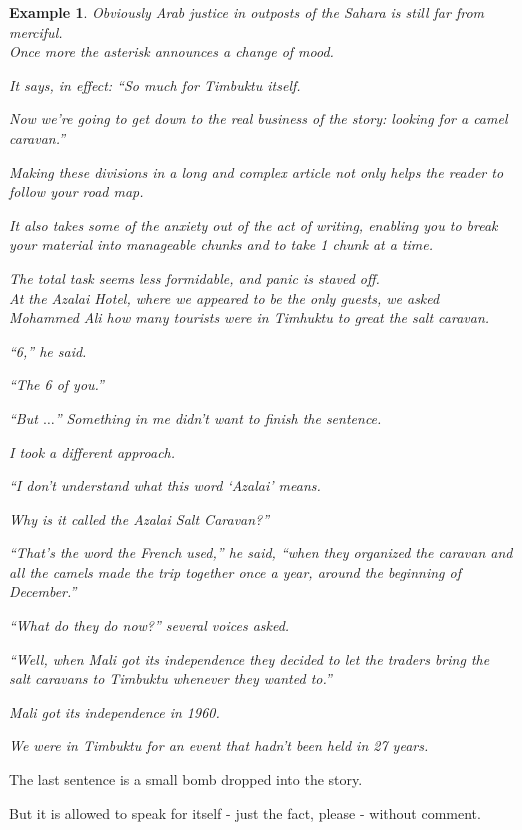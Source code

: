 \documentclass{book}
\numberwithin{equation}{section}
\newtheorem{example}{Example}[chapter]
\begin{document}
\begin{example}
    Obviously Arab justice in outposts of the Sahara is still far from merciful.
    \\
    
    Once more the asterisk announces a change of mood.
    
    It says, in effect: ``So much for Timbuktu itself.
    
    Now we're going to get down to the real business of the story: looking for a camel caravan.''
    
    Making these divisions in a long and complex article not only helps the reader to follow your road map.
    
    It also takes some of the anxiety out of the act of writing, enabling you to break your material into manageable chunks and to take 1 chunk at a time.
    
    The total task seems less formidable, and panic is staved off.
    \\
    
    At the Azalai Hotel, where we appeared to be the only guests, we asked Mohammed Ali how many tourists were in Timhuktu to great the salt caravan.
    
    ``6,'' he said.
    
    ``The 6 of you.''
    
    ``But $\ldots$'' Something in me didn't want to finish the sentence.
    
    I took a different approach.
    
    ``I don't understand what this word `Azalai' means.
    
    Why is it called the Azalai Salt Caravan?''
    
    ``That's the word the French used,'' he said, ``when they organized the caravan and all the camels made the trip together once a year, around the beginning of December.''
    
    ``What do they do now?'' several voices asked.
    
    ``Well, when Mali got its independence they decided to let the traders bring the salt caravans to Timbuktu whenever they wanted to.''
    
    Mali got its independence in 1960.
    
    We were in Timbuktu for an event that hadn't been held in 27 years.
\end{example}
The last sentence is a small bomb dropped into the story.

But it is allowed to speak for itself - just the fact, please - without comment.
\end{document}
